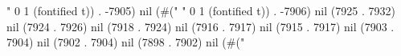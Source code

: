 " 0 1 (fontified t)) . -7905) nil (#(" " 0 1 (fontified t)) . -7906) nil (7925 . 7932) nil (7924 . 7926) nil (7918 . 7924) nil (7916 . 7917) nil (7915 . 7917) nil (7903 . 7904) nil (7902 . 7904) nil (7898 . 7902) nil (#("%